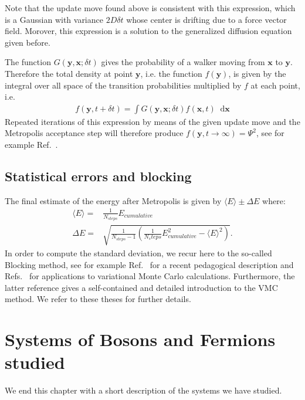 \documentclass[twoside,english]{uiofysmaster}
\newcommand*\dif{\mathop{}\!\mathrm{d}}
\begin{document}
Note that the update move found above is consistent with this
expression, which is a Gaussian with variance $2D \delta t$ whose
center is drifting due to a force vector field. Morover, this
expression is a solution to the generalized diffusion equation given
before.

The function $G(\bm{y}, \bm{x}; \delta t)$ gives the probability of a
walker moving from $\bm{x}$ to $\bm{y}$. Therefore the total density
at point $\bm{y}$, i.e. the function $f(\bm{y})$, is given by the
integral over all space of the transition probabilities multiplied by
$f$ at each point, i.e.
\begin{align}
	f(\bm{y} , t + \delta t) = \int G(\bm{y}, \bm{x}; \delta t)  f(\bm{x}, t) \dif \bm{x}
\end{align}
Repeated iterations of this expression by means of the given update move and the Metropolis acceptance step will therefore produce 
$f (\bm{y}, t \to \infty) = \Psi^2$, see for example Ref.~\cite{Hammond1994}.

\subsection{Statistical errors and blocking}

The final estimate of the energy after Metropolis is given by $\langle
E \rangle \pm \Delta E$ where:
\begin{align}
	\langle E \rangle =& \frac{1}{N_{steps}} E_{cumulative} \\
	\Delta E =& \sqrt{ \frac{1}{N_{steps}-1} ( \frac{1}{N_steps} E_{cumulative}^2 - \langle E \rangle^2 ) }.
\end{align}
In order to compute the standard deviation, we recur here to the
so-called Blocking method, see for example
Ref.~\cite{mariusthesis2018} for a recent pedagogical description and
Refs.~\cite{Ledumthesis2018,Alociasthesis2018} for applications to
variational Monte Carlo calculations. Furthermore, the latter
reference gives a self-contained and detailed introduction to the VMC
method. We refer to these theses for further details.

\section{Systems of Bosons and Fermions studied}

We end this chapter with a short description of the systems we have studied.
\end{document}
